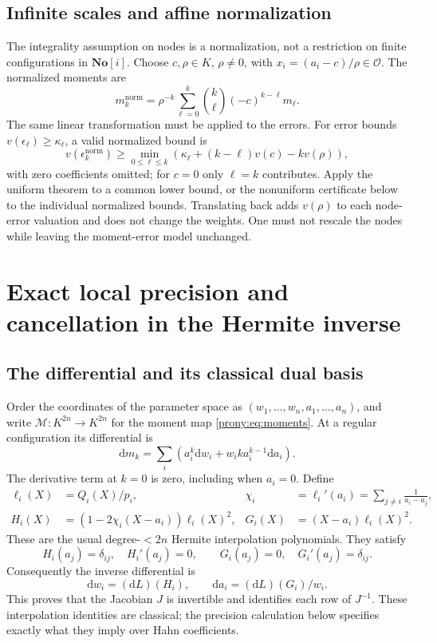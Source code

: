 \documentclass[11pt,letterpaper]{article}
\theoremstyle{definition}
\theoremstyle{remark}
\newcommand{\SC}{\mathbf{No}[i]}
\newcommand{\Ocal}{\mathcal O}
\newcommand{\mom}{\mathcal M}
\newcommand{\dd}{\mathrm d}
\begin{document}
\subsection{Infinite scales and affine normalization}
The integrality assumption on nodes is a normalization, not a restriction
on finite configurations in $\SC$. Choose $c,\rho\in K$, $\rho\ne0$, with
$x_i=(a_i-c)/\rho\in\Ocal$. The normalized moments are
\begin{equation}\label{prony:eq:affine}
 m^{\mathrm{norm}}_k
 =\rho^{-k}\sum_{\ell=0}^k\binom{k}{\ell}(-c)^{k-\ell}m_\ell.
\end{equation}
The same linear transformation must be applied to the errors. For error
bounds $v(\epsilon_\ell)\ge\kappa_\ell$, a valid normalized bound is
\[
 v(\epsilon^{\mathrm{norm}}_k)
 \ge\min_{0\le\ell\le k}
 \left(\kappa_\ell+(k-\ell)v(c)-k v(\rho)\right),
\]
with zero coefficients omitted; for $c=0$ only $\ell=k$ contributes.
Apply the uniform theorem to a common lower bound, or the nonuniform
certificate below to the individual normalized bounds. Translating back
adds $v(\rho)$ to each node-error valuation and does not change the weights.
One must not rescale the nodes while leaving the moment-error model
unchanged.

\section{Exact local precision and cancellation in the Hermite inverse}
\label{prony:sec:lattice}

\subsection{The differential and its classical dual basis}
Order the coordinates of the parameter space as
$(w_1,\ldots,w_n,a_1,\ldots,a_n)$, and write
$\mom:K^{2n}\to K^{2n}$ for the moment map \eqref{prony:eq:moments}.
At a regular configuration its differential is
\begin{equation}\label{prony:eq:diff}
 \dd m_k=\sum_i\left(a_i^k\dd w_i+w_i k a_i^{k-1}\dd a_i\right).
\end{equation}
The derivative term at $k=0$ is zero, including when $a_i=0$.
Define
\begin{equation}\label{prony:eq:hermite}
\begin{aligned}
 \ell_i(X)&=Q_i(X)/p_i,&
 \chi_i&=\ell_i'(a_i)=\sum_{j\ne i}\frac1{a_i-a_j},\\
 H_i(X)&=(1-2\chi_i(X-a_i))\ell_i(X)^2,&
 G_i(X)&=(X-a_i)\ell_i(X)^2.
\end{aligned}
\end{equation}
These are the usual degree-$<2n$ Hermite interpolation polynomials.
They satisfy
\[
 H_i(a_j)=\delta_{ij},\quad H_i'(a_j)=0,\qquad
 G_i(a_j)=0,\quad G_i'(a_j)=\delta_{ij}.
\]
Consequently the inverse differential is
\begin{equation}\label{prony:eq:invdiff}
 \dd w_i=(\dd L)(H_i),\qquad
 \dd a_i=(\dd L)(G_i)/w_i.
\end{equation}
This proves that the Jacobian $J$ is invertible and identifies each row of
$J^{-1}$. These interpolation identities are classical; the precision
calculation below specifies exactly what they imply over Hahn coefficients.
\end{document}
